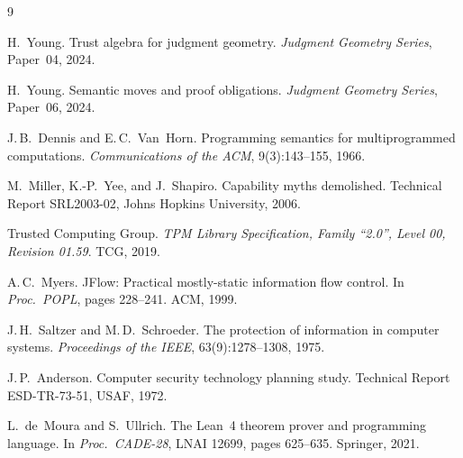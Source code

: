 \documentclass[11pt]{article}
\begin{document}
\begin{thebibliography}{9}

H.~Young.
\newblock Trust algebra for judgment geometry.
\newblock \textit{Judgment Geometry Series}, Paper~04, 2024.

H.~Young.
\newblock Semantic moves and proof obligations.
\newblock \textit{Judgment Geometry Series}, Paper~06, 2024.

J.\,B.\ Dennis and E.\,C.\ Van~Horn.
\newblock Programming semantics for multiprogrammed computations.
\newblock \textit{Communications of the ACM}, 9(3):143--155, 1966.

M.~Miller, K.-P.~Yee, and J.~Shapiro.
\newblock Capability myths demolished.
\newblock Technical Report SRL2003-02, Johns Hopkins University, 2006.

Trusted Computing Group.
\newblock \textit{TPM Library Specification, Family ``2.0'', Level 00,
  Revision 01.59}.
\newblock TCG, 2019.

A.\,C.\ Myers.
\newblock JFlow: Practical mostly-static information flow control.
\newblock In \textit{Proc.\ POPL}, pages 228--241. ACM, 1999.

J.\,H.\ Saltzer and M.\,D.\ Schroeder.
\newblock The protection of information in computer systems.
\newblock \textit{Proceedings of the IEEE}, 63(9):1278--1308, 1975.

J.\,P.\ Anderson.
\newblock Computer security technology planning study.
\newblock Technical Report ESD-TR-73-51, USAF, 1972.

L.~de~Moura and S.~Ullrich.
\newblock The {Lean~4} theorem prover and programming language.
\newblock In \textit{Proc.\ CADE-28}, LNAI 12699, pages 625--635.
  Springer, 2021.

\end{thebibliography}
\end{document}
